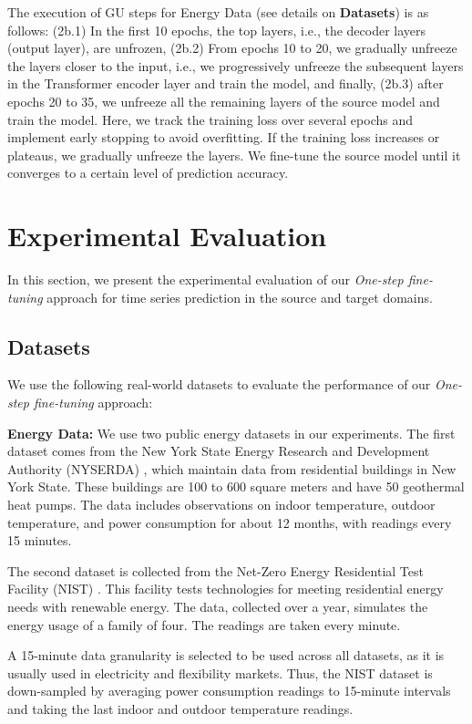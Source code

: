 \documentclass[letterpaper]{article} %
\begin{document}
The execution of GU steps for Energy Data (see details on \textbf{Datasets}) is as follows: (2b.1) In the first 10 epochs, the top layers, i.e., the decoder layers (output layer), are unfrozen, (2b.2) From epochs 10 to 20, we gradually unfreeze the layers closer to the input, i.e., we progressively unfreeze the subsequent layers in the Transformer encoder layer and train the model, and finally, (2b.3) after epochs 20 to 35, we unfreeze all the remaining layers of the source model and train the model. Here, we track the training loss over several epochs and implement early stopping to avoid overfitting. If the training loss increases or plateaus, we gradually unfreeze the layers. We fine-tune the source model until it converges to a certain level of prediction accuracy.

\section{Experimental Evaluation}
In this section, we present the experimental evaluation of our \emph{One-step fine-tuning} approach for time series prediction in the source and target domains.

\subsection{Datasets}
We use the following real-world datasets to evaluate the performance of our \emph{One-step fine-tuning} approach:

\textbf{Energy Data:} We use two public energy datasets in our experiments. The first dataset comes from the New York State Energy Research and Development Authority (NYSERDA) \cite{NYSERDA}, which maintain data from residential buildings in New York State. These buildings are 100 to 600 square meters and have 50 geothermal heat pumps. The data includes observations on indoor temperature, outdoor temperature, and power consumption for about 12 months, with readings every 15 minutes.

The second dataset is collected from the Net-Zero Energy Residential Test Facility (NIST) \cite{nist}. This facility tests technologies for meeting residential energy needs with renewable energy. The data, collected over a year, simulates the energy usage of a family of four. The readings are taken every minute.

A 15-minute data granularity is selected to be used across all datasets, as it is usually used in electricity and flexibility markets. Thus, the NIST dataset is down-sampled by averaging power consumption readings to 15-minute intervals and taking the last indoor and outdoor temperature readings.
\end{document}
